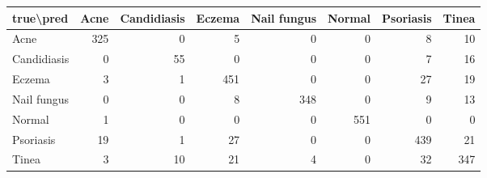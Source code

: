 \begin{tabular}{lrrrrrrr}
\toprule
true\textbackslash pred & Acne & Candidiasis & Eczema & Nail fungus & Normal & Psoriasis & Tinea \\
\midrule
Acne & 325 & 0 & 5 & 0 & 0 & 8 & 10 \\
Candidiasis & 0 & 55 & 0 & 0 & 0 & 7 & 16 \\
Eczema & 3 & 1 & 451 & 0 & 0 & 27 & 19 \\
Nail fungus & 0 & 0 & 8 & 348 & 0 & 9 & 13 \\
Normal & 1 & 0 & 0 & 0 & 551 & 0 & 0 \\
Psoriasis & 19 & 1 & 27 & 0 & 0 & 439 & 21 \\
Tinea & 3 & 10 & 21 & 4 & 0 & 32 & 347 \\
\bottomrule
\end{tabular}
